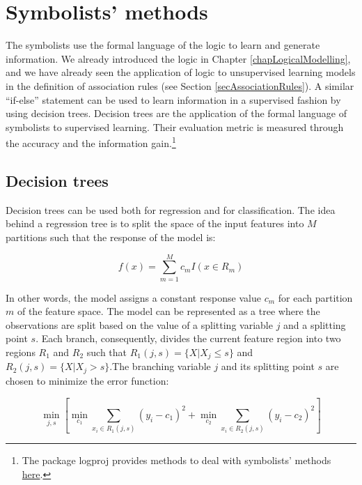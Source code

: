 \section{Symbolists’ methods} 

The symbolists use the formal language of the logic to learn and generate information. We already introduced the logic in Chapter \ref{chapLogicalModelling}, and we have already seen the application of logic to unsupervised learning models in the definition of association rules (see Section \ref{secAssociationRules}). A similar “if-else” statement can be used to learn information in a supervised fashion by using decision trees. Decision trees are the application of the formal language of symbolists to supervised learning. Their evaluation metric is measured through the accuracy and the information gain.\footnote{The package logproj provides methods to deal with symbolists' methods \href{https://github.com/aletuf93/logproj/blob/master/logproj/M_learningMethod/symbolists_models.py}{here}.}

\subsection{Decision trees} \label{secDecisionTrees}
Decision trees can be used both for regression and for classification. The idea behind a regression tree is to split the space of the input features into $M$ partitions such that the response of the model is:

\begin{equation}
        f\left(x\right)=\sum_{m=1}^{M}{c_mI\left(x\in R_m\right)}
        \label{eq_decisionTree1}
\end{equation}

In other words, the model assigns a constant response value $c_m$ for each partition $m$ of the feature space. The model can be represented as a tree where the observations are split based on the value of a splitting variable $j$ and a splitting point $s$. Each branch, consequently, divides the current feature region into two regions $R_1$ and $R_2$ such that $R_1\left(j,s\right)=\{X|X_j\le s\}$ and  $R_2\left(j,s\right)=\{X|X_j>s\}$.The branching variable $j$ and its splitting point $s$ are chosen to minimize the error function:

\begin{equation}
        \min_{j,s}{\left[\min_{c_1}{\sum_{x_i\in R_1(j,s)}\left(y_i-c_1\right)^2}+\min_{c_2}{\sum_{x_i\in R_2(j,s)}\left(y_i-c_2\right)^2}\right]}
        \label{eq_decisionTree2}
\end{equation}

